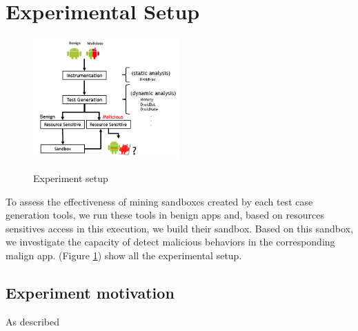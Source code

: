 \section{Experimental Setup}
\begin{figure}[h!]
  \includegraphics[width=0.5\textwidth]{images/setup.png}
  \label{Experiment setup}
  \caption{Experiment setup}
  \label{fig:setup}
\end{figure}

To assess the effectiveness of mining sandboxes created by each test case generation tools, we run these tools in benign apps and, based on resources sensitives access in this execution, we build their sandbox. Based on this sandbox, we investigate the capacity of detect malicious behaviors in the corresponding malign app. (Figure  \ref{fig:setup}) show all the experimental setup.

\subsection{Experiment motivation}

As described 

